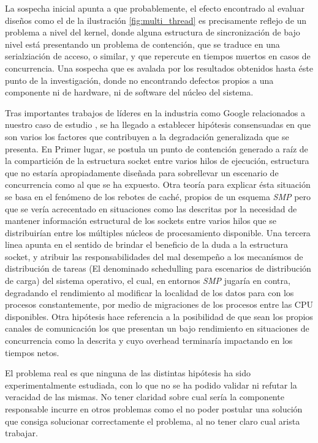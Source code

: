 La sospecha inicial apunta a que probablemente, el efecto encontrado al evaluar diseños como el de la ilustración \ref{fig:multi_thread} es precisamente reflejo de un problema a nivel del kernel, donde alguna estructura de sincronización de bajo nivel está presentando un problema de contención, que se traduce en una serialziación de acceso, o similar, y que repercute en tiempos muertos en casos de concurrencia. Una sospecha que es avalada por los resultados obtenidos hasta éste punto de la investigación, donde no encontrando defectos propios a una componente ni de hardware, ni de software del núcleo del sistema.

Tras importantes trabajos de líderes en la industria como Google relacionados a nuestro caso de estudio \cite{slides:googleReuseport}, se ha llegado a establecer hipótesis consensuadas en que son varios los factores que contribuyen a la degradación generalizada que se presenta. En Primer lugar, se postula un punto de contención generado a raíz de la compartición de la estructura socket entre varios hilos de ejecución, estructura que no estaría apropiadamente diseñada para sobrellevar un escenario de concurrencia como al que se ha expuesto. Otra teoría para explicar ésta situación se basa en el fenómeno de los rebotes de caché, propios de un esquema \emph{SMP} pero que se vería acrecentado en situaciones como las descritas por la necesidad de mantener información estructural de los sockets entre varios hilos que se distribuirían entre los múltiples núcleos de procesamiento disponible. Una tercera linea apunta en el sentido de brindar el beneficio de la duda a la estructura socket, y atribuir las responsabilidades del mal desempeño a los mecanísmos de distribución de tareas (El denominado schedulling para escenarios de distribución de carga) del sistema operativo, el cual, en entornos \emph{SMP} jugaría en contra, degradando el rendimiento al modificar la localidad de los datos para con los procesos constantemente, por medio de migraciones de los procesos entre las CPU disponibles. Otra hipótesis hace referencia a la posibilidad de que sean los propios canales de comunicación los que presentan un bajo rendimiento en situaciones de concurrencia como la descrita y cuyo overhead terminaría impactando en los tiempos netos.

El problema real es que ninguna de las distintas hipótesis ha sido experimentalmente estudiada, con lo que no se ha podido validar ni refutar la veracidad de las mismas. No tener claridad sobre cual sería la componente responsable incurre en otros problemas como el no poder postular una solución que consiga solucionar correctamente el problema, al no tener claro cual arista trabajar.